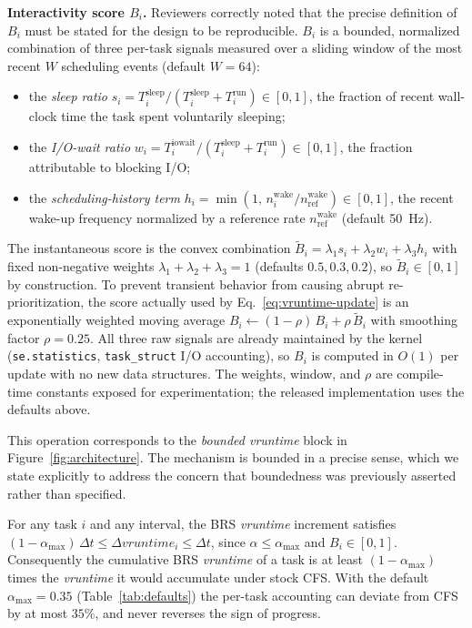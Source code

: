 \textbf{Interactivity score $B_i$.} Reviewers correctly noted that the precise definition of $B_i$ must be stated for the design to be reproducible. $B_i$ is a bounded, normalized combination of three per-task signals measured over a sliding window of the most recent $W$ scheduling events (default $W=64$):
\begin{itemize}
  \item the \emph{sleep ratio} $s_i = T^{\text{sleep}}_i / (T^{\text{sleep}}_i + T^{\text{run}}_i)\in[0,1]$, the fraction of recent wall-clock time the task spent voluntarily sleeping;
  \item the \emph{I/O-wait ratio} $w_i = T^{\text{iowait}}_i / (T^{\text{sleep}}_i + T^{\text{run}}_i)\in[0,1]$, the fraction attributable to blocking I/O;
  \item the \emph{scheduling-history term} $h_i = \min(1,\, n^{\text{wake}}_i / n^{\text{wake}}_{\text{ref}})\in[0,1]$, the recent wake-up frequency normalized by a reference rate $n^{\text{wake}}_{\text{ref}}$ (default \SI{50}{\hertz}).
\end{itemize}
The instantaneous score is the convex combination $\tilde B_i = \lambda_1 s_i + \lambda_2 w_i + \lambda_3 h_i$ with fixed non-negative weights $\lambda_1+\lambda_2+\lambda_3 = 1$ (defaults $0.5,0.3,0.2$), so $\tilde B_i\in[0,1]$ by construction. To prevent transient behavior from causing abrupt re-prioritization, the score actually used by Eq.~\eqref{eq:vruntime-update} is an exponentially weighted moving average $B_i \leftarrow (1-\rho)\,B_i + \rho\,\tilde B_i$ with smoothing factor $\rho=0.25$. All three raw signals are already maintained by the kernel (\texttt{se.statistics}, \texttt{task\_struct} I/O accounting), so $B_i$ is computed in $O(1)$ per update with no new data structures. The weights, window, and $\rho$ are compile-time constants exposed for experimentation; the released implementation uses the defaults above.

This operation corresponds to the \emph{bounded vruntime} block in Figure~\ref{fig:architecture}. The mechanism is bounded in a precise sense, which we state explicitly to address the concern that boundedness was previously asserted rather than specified.

\begin{definition}
\label{def:bound}
For any task $i$ and any interval, the BRS \textit{vruntime} increment satisfies $(1-\alpha_{\max})\,\Delta t \le \Delta\textit{vruntime}_i \le \Delta t$, since $\alpha\le\alpha_{\max}$ and $B_i\in[0,1]$. Consequently the cumulative BRS \textit{vruntime} of a task is at least $(1-\alpha_{\max})$ times the \textit{vruntime} it would accumulate under stock CFS. With the default $\alpha_{\max}=0.35$ (Table~\ref{tab:defaults}) the per-task accounting can deviate from CFS by at most $35\%$, and never reverses the sign of progress.
\end{definition}

